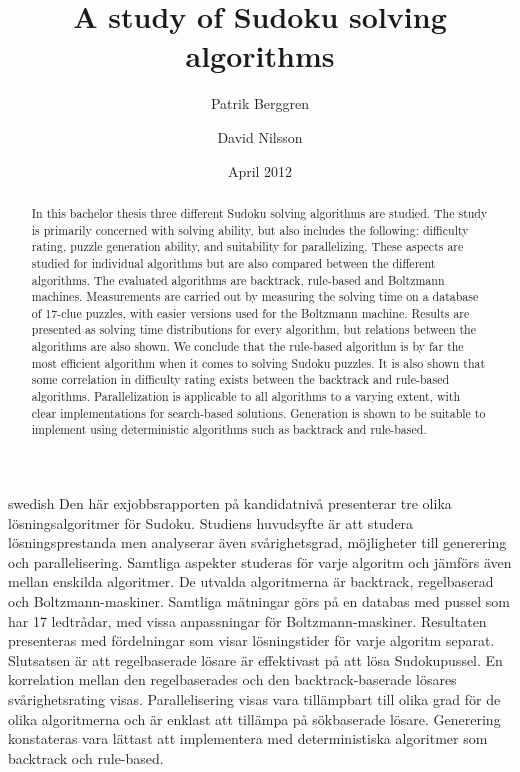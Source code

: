 \documentclass[a4paper,11pt]{kth-mag}
\title{A study of Sudoku solving algorithms}
\subtitle{}
\author{Patrik Berggren \and David Nilsson}
\date{April 2012}
\begin{document}
\frontmatter
\pagestyle{empty}
\removepagenumbers
\maketitle
{}
\begin{abstract}
In this bachelor thesis three different Sudoku solving algorithms are studied.
The study is primarily concerned with solving ability, but also includes the following: difficulty rating, puzzle generation ability, and suitability for parallelizing.
These aspects are studied for individual algorithms but are also compared between the different algorithms.
The evaluated algorithms are backtrack, rule-based and Boltzmann machines.
Measurements are carried out by measuring the solving time on a database of 17-clue puzzles, with easier versions used for the Boltzmann machine.
Results are presented as solving time distributions for every algorithm, but relations between the algorithms are also shown.
We conclude that the rule-based algorithm is by far the most efficient algorithm when it comes to solving Sudoku puzzles.
It is also shown that some correlation in difficulty rating exists between the backtrack and rule-based algorithms.
Parallelization is applicable to all algorithms to a varying extent, with clear implementations for search-based solutions.
Generation is shown to be suitable to implement using deterministic algorithms such as backtrack and rule-based.

\end{abstract}
\clearpage
\begin{foreignabstract}{swedish}
Den här exjobbsrapporten på kandidatnivå presenterar tre olika lösningsalgoritmer för Sudoku.
Studiens huvudsyfte är att studera lösningsprestanda men analyserar även svårighetsgrad, möjligheter till generering och parallelisering.
Samtliga aspekter studeras för varje algoritm och jämförs även mellan enskilda algoritmer.
De utvalda algoritmerna är backtrack, regelbaserad och Boltzmann-maskiner.
Samtliga mätningar görs på en databas med pussel som har 17 ledtrådar, med vissa anpassningar för Boltzmann-maskiner.
Resultaten presenteras med fördelningar som visar lösningstider för varje algoritm separat. 
Slutsatsen är att regelbaserade lösare är effektivast på att lösa Sudokupussel.
En korrelation mellan den regelbaserades och den backtrack-baserade lösares svårighetsrating visas.
Parallelisering visas vara tillämpbart till olika grad för de olika algoritmerna och är enklast att tillämpa på sökbaserade lösare.
Generering konstateras vara lättast att implementera med deterministiska algoritmer som backtrack och rule-based.
\end{foreignabstract}
\clearpage
\end{document}
